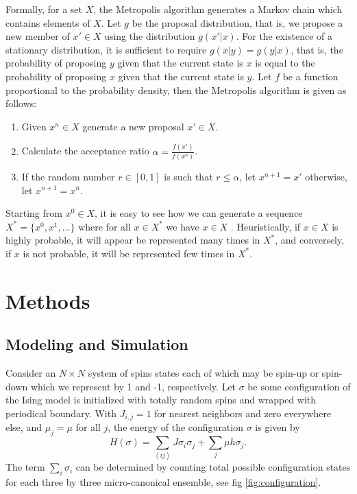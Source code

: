 \documentclass{llncs}
\begin{document}
Formally, for a set $X$, the Metropolis algorithm generates a Markov chain which contains elements of $X$. Let $g$ be the proposal distribution, that is, we propose a new member of $x'\in X$ using the distribution $g(x'|x)$. For the existence of a stationary distribution, it is sufficient to require $g(x|y)=g(y|x)$\cite{}, that is, the probability of proposing $y$ given that the current state is $x$ is equal to the probability of proposing $x$ given that the current state is $y$. Let $f$ be a function proportional to the probability density, then the Metropolis algorithm is given as follows:
\begin{enumerate}
	\item Given $x^{n}\in X$ generate a new proposal $x'\in X$. 
	\item Calculate the acceptance ratio $\alpha =\frac{f(x')}{f(x^{n})}$. 
	\item If the random number $r\in[0,1]$ is such that $r\leq \alpha$, let $x^{n+1}=x'$ otherwise, let $x^{n+1}=x^{n}$. 
\end{enumerate}
Starting from $x^0\in X$, it is easy to see how we can generate a sequence $X^*=\{x^0,x^1,\dots\}$ where for all $ x \in X^*$ we have $x\in X$ \cite{}. Heuristically, if $x\in X$ is highly probable, it will appear be represented many times in $X^*$, and conversely, if $x$ is not probable, it will be represented few times in $X^*$.

\section{Methods}

\subsection{Modeling and Simulation}
\setcounter{equation}{0}
\renewcommand{\theequation}{2.1.\arabic{equation}}
Consider an $N\times N$ system of spins states each of which may be spin-up or spin-down which we represent by 1 and -1, respectively. Let $\sigma$ be some configuration of the Ising model is initialized with totally random spins and wrapped with periodical boundary. With $J_{i,j}=1$ for nearest neighbors and zero everywhere else, and $\mu_j=\mu$ for all $j$, the energy of the configuration $\sigma$ is given by 
\begin{equation} 
H(\sigma)=\sum_{\left<ij\right>}J\sigma_i\sigma_j+\sum_j\mu h\sigma_j.
\end{equation}
The term $\sum_i \sigma_i$ can be determined by counting total possible configuration states for each three by three micro-canonical ensemble, see fig \ref{fig:configuration}. 
\end{document}
